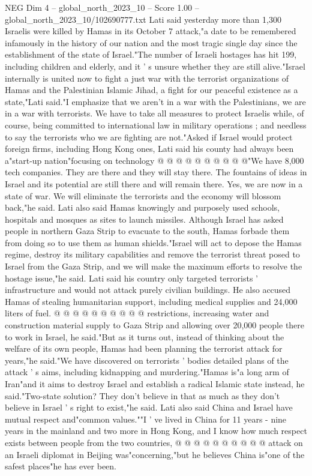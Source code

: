 \begin{textsample}{NEG Dim 4 – global\_north\_2023\_10 – Score 1.00 – global\_north\_2023\_10/102690777.txt}  \label{ex:f4_neg_008}
Lati said yesterday more than 1,300 Israelis were killed by Hamas in its October 7 attack,"a date to be remembered infamously in the history of our nation and the most tragic single day since the establishment of the state of Israel."The number of Israeli hostages has hit 199, including children and elderly, and it ' s unsure whether they are still alive."Israel internally is united now to fight a just war with the terrorist organizations of Hamas and the Palestinian Islamic Jihad, a fight for our peaceful existence as a state,"Lati said."I emphasize that we aren't in a war with the Palestinians, we are in a war with terrorists.
We have to take all measures to protect Israelis while, of course, being committed to international law in military operations ; and needless to say the terrorists who we are fighting are not."Asked if Israel would protect foreign firms, including Hong Kong ones, Lati said his county had always been a"start-up nation"focusing on technology @ @ @ @ @ @ @ @ @ @"We have 8,000 tech companies.
They are there and they will stay there.
The fountains of ideas in Israel and its potential are still there and will remain there.
Yes, we are now in a state of war.
We will eliminate the terrorists and the economy will blossom back,"he said.
Lati also said Hamas knowingly and purposely used schools, hospitals and mosques as sites to launch missiles.
Although Israel has asked people in northern Gaza Strip to evacuate to the south, Hamas forbade them from doing so to use them as human shields."Israel will act to depose the Hamas regime, destroy its military capabilities and remove the terrorist threat posed to Israel from the Gaza Strip, and we will make the maximum efforts to resolve the hostage issue,"he said.
Lati said his country only targeted terrorists ' infrastructure and would not attack purely civilian buildings.
He also accused Hamas of stealing humanitarian support, including medical supplies and 24,000 liters of fuel. @ @ @ @ @ @ @ @ @ @ restrictions, increasing water and construction material supply to Gaza Strip and allowing over 20,000 people there to work in Israel, he said."But as it turns out, instead of thinking about the welfare of its own people, Hamas had been planning the terrorist attack for years,"he said."We have discovered on terrorists ' bodies detailed plans of the attack ' s aims, including kidnapping and murdering."Hamas is"a long arm of Iran"and it aims to destroy Israel and establish a radical Islamic state instead, he said."Two-state solution?
They don't believe in that as much as they don't believe in Israel ' s right to exist,"he said.
Lati also said China and Israel have mutual respect and"common values.""I ' ve lived in China for 11 years - nine years in the mainland and two more in Hong Kong, and I know how much respect exists between people from the two countries, @ @ @ @ @ @ @ @ @ @ attack on an Israeli diplomat in Beijing was"concerning,"but he believes China is"one of the safest places"he has ever been.

\end{textsample}
